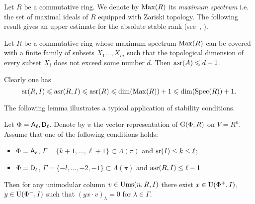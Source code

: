 Let $R$ be a commutative ring. We denote by $\operatorname{Max}(R)$ its \emph{maximum spectrum} i.e. the set of maximal ideals of $R$ equipped with Zariski topology.
The following result gives an upper estimate for the absolute stable rank (see~\cite[Theorem~2.3]{EO}, \cite[Theorem~3.7]{MKV}).
\begin{thm}
Let $R$ be a commutative ring whose maximum spectrum $\operatorname{Max}(R)$ can be covered with a finite family of subsets $X_1\ldots, X_m$ such that the topological dimension of every subset $X_i$ does not exceed some number $d$. Then $\operatorname{asr}(A)\leqslant d+1$.
\end{thm}
Clearly one has
\[ \operatorname{sr}(R,I)\leqslant\operatorname{asr}(R,I)\leqslant\operatorname{asr}(R)\leqslant \dim(\operatorname{Max}(R))+1\leqslant\dim(\operatorname{Spec}(R))+1. \]

The following lemma illustrates a typical application of stability conditions.
\begin{lemma} \label{lemma:uraction} 
Let $\Phi=\mathsf{A}_\ell, \mathsf{D}_\ell$. Denote by $\pi$ the vector representation of $\operatorname{G}(\Phi, R)$ on $V=R^n$.
Assume that one of the following conditions holds:
\begin{itemize}
 \item $\Phi=\mathsf{A}_\ell$, $\Gamma=\{ k+1, \ldots, \ell+1\} \subset \Lambda(\pi)$ and $\operatorname{sr}(I)\leq k\leq \ell$;
 \item $\Phi=\mathsf{D}_\ell$, $\Gamma=\{-l,\ldots, -2, -1\} \subset \Lambda(\pi)$ and $\operatorname{asr}(R, I)\leq \ell-1$. 
\end{itemize}
Then for any unimodular column $v\in \operatorname{Ums}(n, R, I)$ there exist $x\in \operatorname{U}(\Phi^+, I)$, $y\in \operatorname{U}(\Phi^-, I)$ such that $(yx \cdot v)_\lambda = 0$ for $\lambda\in \Gamma$.
\end{lemma}



